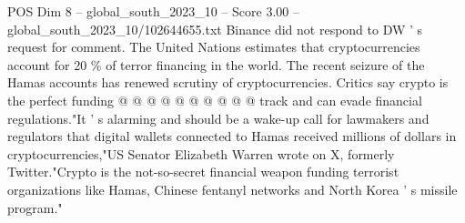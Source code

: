 \begin{textsample}{POS Dim 8 – global\_south\_2023\_10 – Score 3.00 – global\_south\_2023\_10/102644655.txt}
Binance did not respond to DW ' s request for comment.
The United Nations estimates that cryptocurrencies account for 20 \% of terror financing in the world.
The recent seizure of the Hamas accounts has renewed scrutiny of cryptocurrencies.
Critics say crypto is the perfect funding @ @ @ @ @ @ @ @ @ @ track and can evade financial regulations."It ' s alarming and should be a wake-up call for lawmakers and regulators that digital wallets connected to Hamas received millions of dollars in cryptocurrencies,"US Senator Elizabeth Warren wrote on X, formerly Twitter."Crypto is the not-so-secret financial weapon funding terrorist organizations like Hamas, Chinese fentanyl networks and North Korea ' s missile program."

\end{textsample}
